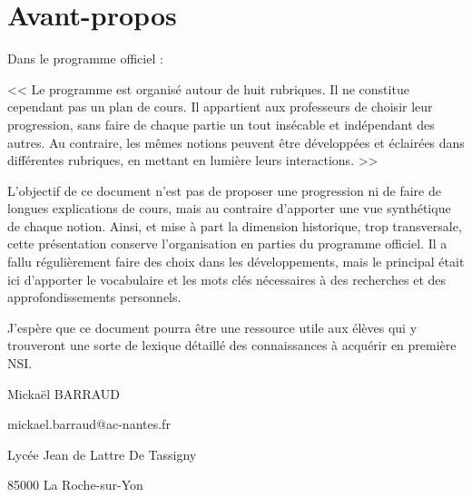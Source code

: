 \chapter*{Avant-propos}


Dans le programme officiel :

\smallskip 

<< Le programme est organisé autour de huit rubriques. Il ne constitue cependant pas un plan de cours. Il appartient aux professeurs de choisir leur progression, sans faire de chaque partie un tout insécable et indépendant des autres. Au contraire, les mêmes notions peuvent être développées et éclairées dans différentes rubriques, en mettant en lumière leurs interactions. >>


L'objectif de ce document n'est pas de proposer une progression ni de faire de longues explications de cours, mais au contraire d'apporter une vue synthétique de chaque notion. Ainsi, et mise à part la dimension historique, trop transversale, cette présentation conserve l'organisation en parties du programme officiel. Il a fallu régulièrement faire des choix dans les développements, mais le principal était ici d'apporter le vocabulaire et les mots clés nécessaires à des recherches et des approfondissements personnels.

J'espère que ce document pourra être une ressource utile aux élèves qui y trouveront une sorte de lexique détaillé des connaissances à acquérir en première NSI. 


\begin{flushright}
Mickaël BARRAUD

mickael.barraud@ac-nantes.fr

Lycée Jean de Lattre De Tassigny

85000 La Roche-sur-Yon
\end{flushright}

